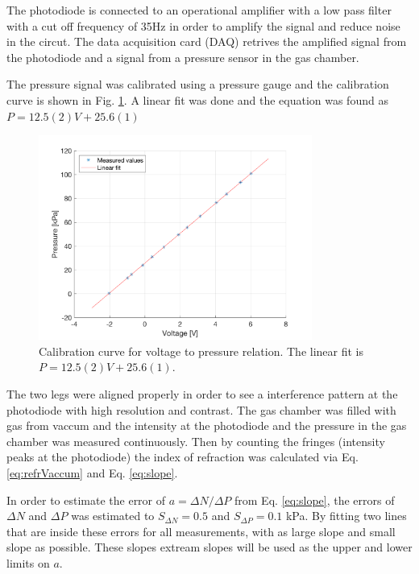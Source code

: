 The photodiode is connected to an operational amplifier with a low pass filter with a cut off frequency of 35Hz in order to amplify the signal and reduce noise in the circut. The data acquisition card (DAQ) retrives the amplified signal from the photodiode and a signal from a pressure sensor in the gas chamber.

The pressure signal was calibrated using a pressure gauge and the calibration curve is shown in Fig. \ref{fig:calibration}. A linear fit was done and the equation was found as $P = 12.5(2)V+25.6(1)$


\begin{figure}[H]
  \centering
  \includegraphics[width=0.8\textwidth]{matlab/calibration.png}
  \caption{Calibration curve for voltage to pressure relation. The linear fit is $P = 12.5(2)V+25.6(1)$.}
  \label{fig:calibration}
\end{figure}

The two legs were aligned properly in order to see a interference pattern at the photodiode with high resolution and contrast. The gas chamber was filled with gas from vaccum and the intensity at the photodiode and the pressure in the gas chamber was measured continuously. Then by counting the fringes (intensity peaks at the photodiode) the index of refraction was calculated via Eq. \ref{eq:refrVaccum} and Eq. \ref{eq:slope}.




In order to estimate the error of $a =\Delta N/ \Delta P$ from Eq. \ref{eq:slope}, the errors of $\Delta N$ and $\Delta P$ was estimated to $S_{\Delta N}=0.5$ and $S_{\Delta P}=0.1$ kPa. By fitting two lines that are inside these errors for all measurements, with as large slope and small slope as possible. These slopes extream slopes will be used as the upper and lower limits on $a$.
